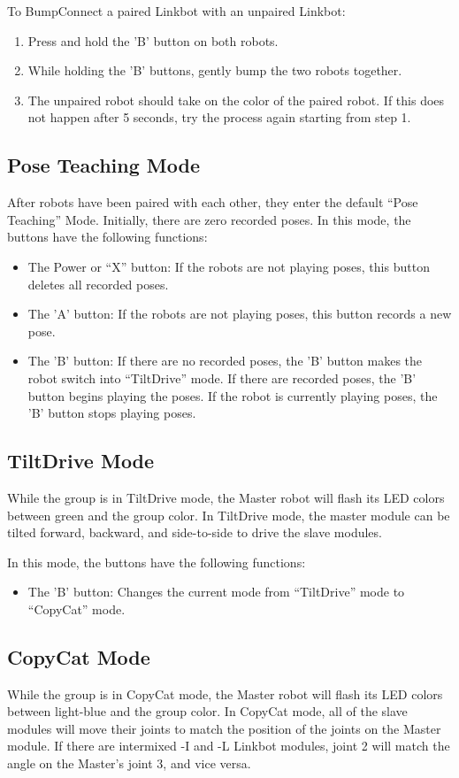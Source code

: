 \documentclass{article}
\begin{document}
To BumpConnect a paired Linkbot with an unpaired Linkbot:
\begin{enumerate}
\item Press and hold the 'B' button on both robots.
\item While holding the 'B' buttons, gently bump the two robots together.
\item The unpaired robot should take on the color of the paired robot. If this
does not happen after 5 seconds, try the process again starting from step 1.
\end{enumerate}

\subsection{Pose Teaching Mode}
After robots have been paired with each other, they enter the default ``Pose Teaching'' Mode.
Initially, there are zero recorded poses. In this mode, the buttons have the following functions:
\begin{itemize}
\item The Power or ``X'' button: If the robots are not playing poses, this button deletes all recorded poses.
\item The 'A' button: If the robots are not playing poses, this button records a new pose. 
\item The 'B' button: If there are no recorded poses, the 'B' button makes the
robot switch into ``TiltDrive'' mode. If there are recorded poses, the 'B'
button begins playing the poses. If the robot is currently playing poses, the 'B' button stops playing poses.
\end{itemize}

\subsection{TiltDrive Mode}
While the group is in TiltDrive mode, the Master robot will flash its LED
colors between green and the group color. In TiltDrive mode, the master 
module can be tilted forward, backward, and side-to-side to drive the slave
modules. 

In this mode, the buttons have the following functions:
\begin{itemize}
\item The 'B' button: Changes the current mode from ``TiltDrive'' mode to ``CopyCat'' mode.
\end{itemize}

\subsection{CopyCat Mode}
While the group is in CopyCat mode, the Master robot will flash its LED
colors between light-blue and the group color. In CopyCat mode,
all of the slave modules will move their joints to match the position
of the joints on the Master module. If there are intermixed -I and -L
Linkbot modules, joint 2 will match the angle on the Master's joint 3, and 
vice versa. 
\end{document}
